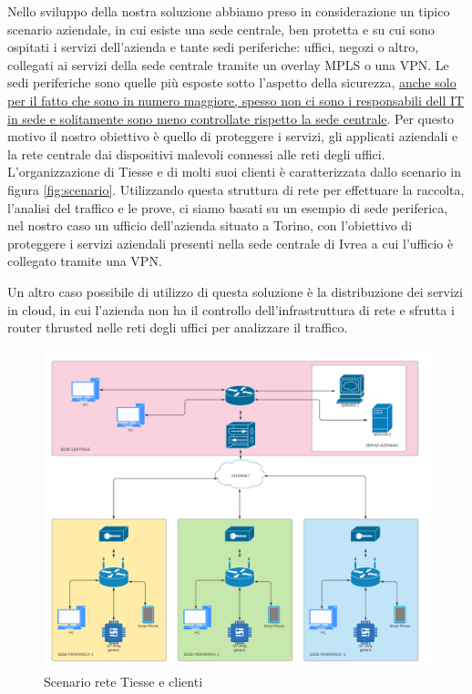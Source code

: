 Nello sviluppo della nostra soluzione abbiamo preso in considerazione un tipico scenario aziendale, in cui esiste una sede centrale, ben protetta e su cui sono ospitati i servizi dell'azienda e tante sedi periferiche: uffici, negozi o altro, collegati ai servizi della sede centrale tramite un overlay MPLS o una VPN.
Le sedi periferiche sono quelle più esposte sotto l'aspetto della sicurezza, \uline{anche solo per il fatto che sono in numero maggiore, spesso non ci sono i responsabili dell IT in sede e solitamente sono meno controllate rispetto la sede centrale}. Per questo motivo il nostro obiettivo è quello di proteggere i servizi, gli applicati aziendali e la rete centrale dai dispositivi malevoli connessi alle reti degli uffici.
L'organizzazione di Tiesse e di molti suoi clienti è caratterizzata dallo scenario in figura \ref{fig:scenario}. Utilizzando questa struttura di rete per effettuare la raccolta, l'analisi del traffico e le prove, ci siamo basati su un esempio di sede periferica, nel nostro caso un ufficio dell'azienda situato a Torino, con l'obiettivo di proteggere i servizi aziendali presenti nella sede centrale di Ivrea a cui l'ufficio è collegato tramite una VPN.

Un altro caso possibile di utilizzo di questa soluzione è la distribuzione dei servizi in cloud, in cui l'azienda non ha il controllo dell'infrastruttura di rete e sfrutta i router thrusted nelle reti degli uffici per analizzare il traffico.


\begin{figure}[]
    \label{fig:scenario_2}
    \includegraphics[width=\hsize]{images/introduzione/scenario.png}
    \caption{Scenario rete Tiesse e clienti}
    \centering
\end{figure}


